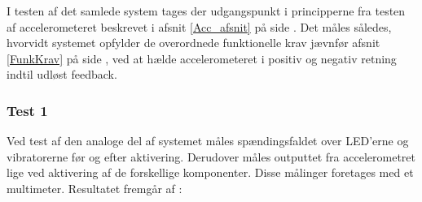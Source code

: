 \noindent I testen af det samlede system tages der udgangspunkt i principperne fra testen af accelerometeret beskrevet i afsnit \ref{Acc_afsnit} på side \pageref{Acc_afsnit}. Det måles således, hvorvidt systemet opfylder de overordnede funktionelle krav jævnfør afsnit \ref{FunkKrav} på side \pageref{FunkKrav}, ved at hælde accelerometeret i positiv og negativ retning indtil udløst feedback.
\subsubsection{Test 1}
Ved test af den analoge del af systemet måles spændingsfaldet over LED'erne og vibratorerne før og efter aktivering. Derudover måles outputtet fra accelerometret lige ved aktivering af de forskellige komponenter. Disse målinger foretages med et multimeter. Resultatet fremgår af :
